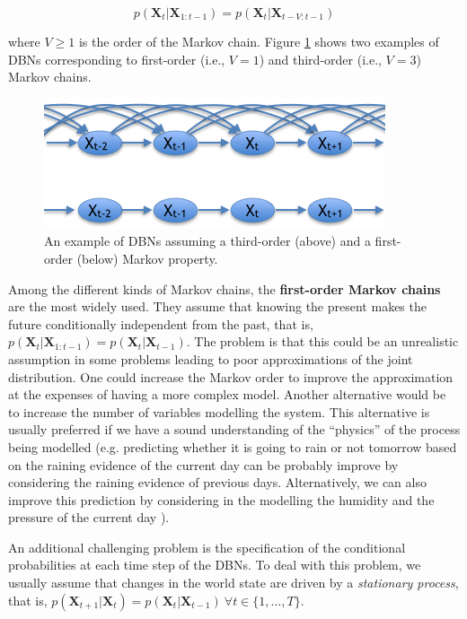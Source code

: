 $$p(\bm X_t| \bm X_{1:t-1})  = p(\bm X_t|\bm X_{t-V:t-1})$$

\noindent where $V\geq 1$ is the order of the Markov chain. Figure \ref{Figure:markovChain} shows two examples of DBNs corresponding to first-order (i.e., $V=1$) and third-order (i.e., $V=3$) Markov chains. 

\begin{figure}[ht!]
\begin{center}
\includegraphics[scale=0.56]{./figures/PreliminariesMarkovChain}
\caption{\label{Figure:markovChain} An example of DBNs assuming a third-order (above) and a first-order (below) Markov property.
}
\end{center}
\end{figure}

Among the different kinds of Markov chains, the \textbf{first-order Markov chains} are the most widely used. They assume that knowing the present makes the future conditionally independent from the past, that is, $p(\bm X_t| \bm X_{1:t-1})  = p(\bm X_t|\bm X_{t-1})$. The problem is that this could be an unrealistic assumption in some problems leading to poor approximations of the joint distribution. One could increase the Markov order to improve the approximation at the expenses of having a more complex model. Another  alternative \cite{russelNorvig2009} would be to increase the number of variables modelling the system. This alternative is usually preferred if we have a sound understanding of the ``physics''  of the process being modelled (e.g. predicting whether it is going to rain or not tomorrow based on the raining evidence of the current day can be probably improve by considering the raining evidence of previous days. Alternatively, we can also improve this prediction by considering in the modelling the humidity and the pressure of the current day \cite{russelNorvig2009}). 

An additional challenging problem is the specification of the conditional probabilities at each time step of the DBNs. To deal with this problem, we usually assume that changes in the world state are driven by a \textit{stationary process}, that is, $p(\bm X_{t+1}|\bm X_{t}) = p(\bm X_t|\bm X_{t-1})\ \forall t \in\{1,\ldots,T\}$. 

